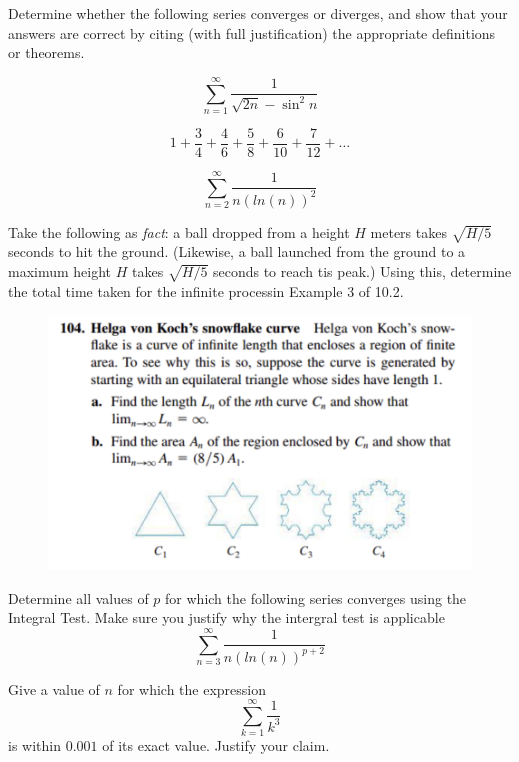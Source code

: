 \documentclass{article}
\newenvironment{problem}[2][Problem]{\begin{trivlist}
\item[\hskip \labelsep {\bfseries #1}\hskip \labelsep {\bfseries #2.}]}{\end{trivlist}}
\begin{document}
\begin{problem}{2.1}
  Determine whether the following series converges or diverges,
  and show that your answers are correct by citing (with full
  justification) the appropriate definitions or theorems.
\end{problem}
\begin{problem}{2.1.1}
  \[ \sum_{n=1}^{\infty}\frac{1}{\sqrt{2n}-\sin^{2}{n}}\]
\end{problem}
\begin{problem}{2.1.2}
  \[ 1 + \frac{3}{4} + \frac{4}{6} + \frac{5}{8} + \frac{6}{10} +
  \frac{7}{12} + \dots \]
\end{problem}
\begin{problem}{2.1.3}
  \[ \sum_{n=2}^{\infty}\frac{1}{n(ln(n))^{2}}\]
\end{problem}
\begin{problem}{3.1}
  Take the following as \textit{fact}: a ball dropped from a height
  $ H $ meters takes $ \sqrt{H/5}$ seconds to hit the ground.
  (Likewise, a ball launched from the ground to a maximum height
  $ H$ takes $ \sqrt{H/5}$ seconds to reach tis peak.) Using this,
  determine the total time taken for the infinite processin Example 3 of 10.2.
\end{problem}
\newpage
\begin{problem}{4.1}
  \begin{figure}

    \includegraphics[width=0.85\linewidth]{problem.png}
  \end{figure}

\end{problem}

\begin{problem}{5.1}
  Determine all values of $ p $ for which the following series
  converges using the Integral Test. Make sure you justify
  why the intergral test is applicable
  \[ \sum_{n=3}^{\infty}\frac{1}{n(ln(n))^{p+2}}\]
\end{problem}
\begin{problem}{6.1}
  Give a value of $ n $ for which the expression
  \[ \sum_{k=1}^{\infty}\frac{1}{k^{3}}\]
  is within $ 0.001 $ of its exact value. Justify your claim.
\end{problem}
\end{document}
